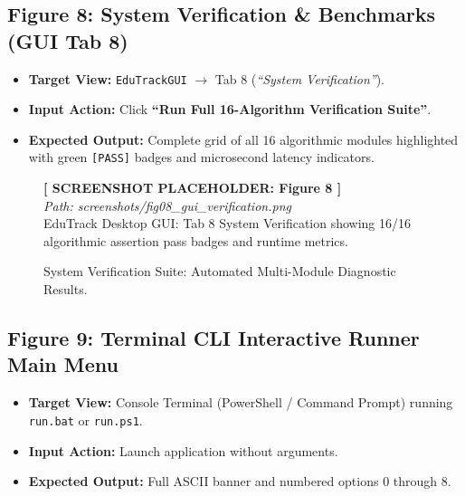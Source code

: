 \subsection{Figure 8: System Verification \& Benchmarks (GUI Tab 8)}
\begin{itemize}
    \item \textbf{Target View:} \texttt{EduTrackGUI} $\to$ Tab 8 (\textit{``System Verification''}).
    \item \textbf{Input Action:} Click \textbf{``Run Full 16-Algorithm Verification Suite''}.
    \item \textbf{Expected Output:} Complete grid of all 16 algorithmic modules highlighted with green \texttt{[PASS]} badges and microsecond latency indicators.
\end{itemize}

\begin{figure}[H]
\centering
\begin{tcolorbox}[colback=white,colframe=codegray,width=0.92\textwidth,halign=center]
\vspace{0.8cm}
\textbf{[ SCREENSHOT PLACEHOLDER: Figure 8 ]}\\
\textit{Path: screenshots/fig08_gui_verification.png}\\
\small EduTrack Desktop GUI: Tab 8 System Verification showing 16/16 algorithmic assertion pass badges and runtime metrics.
\vspace{0.8cm}
\end{tcolorbox}
\caption{System Verification Suite: Automated Multi-Module Diagnostic Results.}
\label{fig:ss_verification}
\end{figure}

\subsection{Figure 9: Terminal CLI Interactive Runner Main Menu}
\begin{itemize}
    \item \textbf{Target View:} Console Terminal (PowerShell / Command Prompt) running \texttt{run.bat} or \texttt{run.ps1}.
    \item \textbf{Input Action:} Launch application without arguments.
    \item \textbf{Expected Output:} Full ASCII banner and numbered options $0$ through $8$.
\end{itemize}

